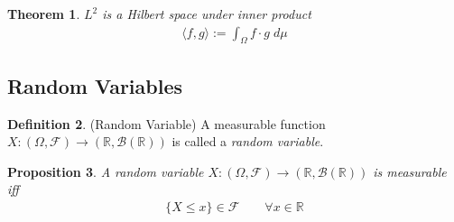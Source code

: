 \documentclass[12pt]{article}
\theoremstyle{plain}
\newtheorem{thm}{Theorem}[section]
\newtheorem{prop}[thm]{Proposition}
\theoremstyle{definition}
\newtheorem{defn}[thm]{Definition}
\theoremstyle{remark}
\newcommand{\ra}{\rightarrow}
\newcommand{\sF}{\mathscr{F}}
\newcommand{\sB}{\mathscr{B}}
\newcommand{\R}{\mathbb{R}}
\begin{document}
\begin{thm}
$L^2$ is a Hilbert space under inner product
\begin{align*}
  \langle f,g \rangle
  := \int_\Omega f\cdot g \; d\mu
\end{align*}
\end{thm}

\clearpage
\subsection{Random Variables}

\begin{defn}(Random Variable)
A measurable function $X:(\Omega,\sF)\ra (\R,\sB(\R))$ is called a
\emph{random variable}.
\end{defn}

\begin{prop}
A random variable $X:(\Omega,\sF)\ra (\R,\sB(\R))$ is measurable iff
\begin{align*}
  \{X\leq x\} \in \sF
  \qquad \forall x\in\R
\end{align*}
\end{prop}
\end{document}
